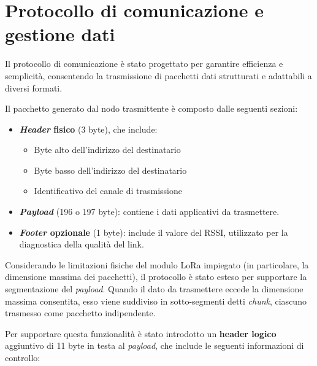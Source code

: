 \documentclass[12pt,a4paper,twoside]{book}
\begin{document}
\section{Protocollo di comunicazione e gestione dati}

Il protocollo di comunicazione è stato progettato per garantire efficienza e
semplicità, consentendo la trasmissione di pacchetti dati strutturati e adattabili
a diversi formati.

Il pacchetto generato dal nodo trasmittente è composto dalle seguenti sezioni:

\begin{itemize}
    \item \textbf{\emph{Header} fisico} (3 byte), che include:
          \begin{itemize}
              \item Byte alto dell’indirizzo del destinatario
              \item Byte basso dell’indirizzo del destinatario
              \item Identificativo del canale di trasmissione
          \end{itemize}
    \item \textbf{\emph{Payload}} (196 o 197 byte): contiene i dati applicativi da trasmettere.

    \item \textbf{\emph{Footer} opzionale} (1 byte): include il valore del \ac{RSSI},
          utilizzato per la diagnostica della qualità del link.
\end{itemize}

Considerando le limitazioni fisiche del modulo \ac{LoRa} impiegato (in particolare,
la dimensione massima dei pacchetti), il protocollo è stato esteso per supportare
la segmentazione del \emph{payload}. Quando il dato da trasmettere eccede la dimensione
massima consentita, esso viene suddiviso in sotto-segmenti detti \emph{chunk},
ciascuno trasmesso come pacchetto indipendente.

Per supportare questa funzionalità è stato introdotto un \textbf{header logico}
aggiuntivo di 11 byte in testa al \emph{payload}, che include le seguenti informazioni di controllo:
\end{document}
